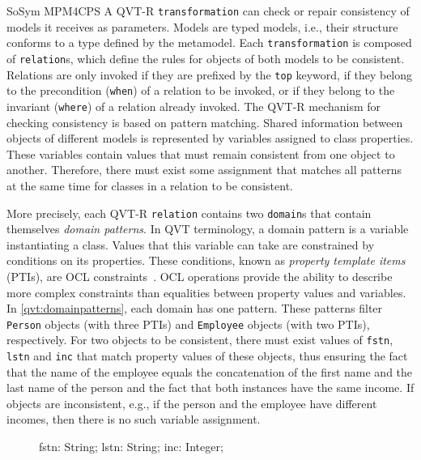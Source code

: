 \begin{copiedFrom}{SoSym MPM4CPS}
A QVT-R \texttt{transformation} can check or repair consistency of models it receives as parameters. Models are typed models, i.e., their structure conforms to a type defined by the metamodel. Each \texttt{transformation} is composed of \texttt{relation}s, which define the rules for objects of both models to be consistent. Relations are only invoked if they are prefixed by the \texttt{top} keyword, if they belong to the precondition (\texttt{when}) of a relation to be invoked, or if they belong to the invariant (\texttt{where}) of a relation already invoked. The QVT-R mechanism for checking consistency is based on pattern matching. Shared information between objects of different models is represented by variables assigned to class properties. These variables contain values that must remain consistent from one object to another. Therefore, there must exist some assignment that matches all patterns at the same time for classes in a relation to be consistent. 

More precisely, each QVT-R \texttt{relation} contains two \texttt{domain}s that contain themselves \textit{domain patterns}. In QVT terminology, a domain pattern is a variable instantiating a class. Values that this variable can take are constrained by conditions on its properties. These conditions, known as \textit{property template items} (PTIs), are OCL constraints~\cite{ocl}. OCL operations provide the ability to describe more complex constraints than equalities between property values and variables. In \autoref{qvt:domainpatterns}, each domain has one pattern. These patterns filter \texttt{Person} objects (with three PTIs) and \texttt{Employee} objects (with two PTIs), respectively. For two objects to be consistent, there must exist values of \texttt{fstn}, \texttt{lstn} and \texttt{inc} that match property values of these objects, thus ensuring the fact that the name of the employee equals the concatenation of the first name and the last name of the person and the fact that both instances have the same income. If objects are inconsistent, e.g., if the person and the employee have different incomes, then there is no such variable assignment.

\begin{figure}
\begin{embeddedqvtcode}[frame=bt, numbers=none, mathescape=true, caption={[Two domains, each with one domain pattern]Two domains, each with one domain pattern. Taken from \owncite{klare2020compatibility-report}.},label={qvt:domainpatterns},captionpos=b]
fstn: String; lstn: String;
inc: Integer;


\end{embeddedqvtcode}
\end{figure}
\end{copiedFrom}
